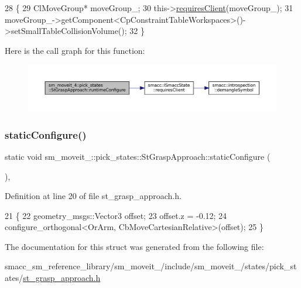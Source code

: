 \begin{DoxyCode}
28     \{
29         ClMoveGroup* moveGroup\_;
30         this->\hyperlink{classsmacc_1_1ISmaccState_a7f95c9f0a6ea2d6f18d1aec0519de4ac}{requiresClient}(moveGroup\_);
31         moveGroup\_->getComponent<CpConstraintTableWorkspaces>()->setSmallTableCollisionVolume();
32     \}
\end{DoxyCode}
Here is the call graph for this function\+:
\nopagebreak
\begin{figure}[H]
\begin{center}
\leavevmode
\includegraphics[width=350pt]{structsm__moveit__4_1_1pick__states_1_1StGraspApproach_a720bc0cdf90f16b038c22fdb717bb3a7_cgraph}
\end{center}
\end{figure}
\mbox{\label{structsm__moveit__4_1_1pick__states_1_1StGraspApproach_af561cae9fd41e10797391012ae7ad361}} 
\subsubsection{\texorpdfstring{static\+Configure()}{staticConfigure()}}
{\footnotesize\ttfamily static void sm\+\_\+moveit\+\_\+::pick\+\_\+states\+::\+St\+Grasp\+Approach\+::static\+Configure (\begin{DoxyParamCaption}{ }\end{DoxyParamCaption})\hspace{0.3cm}{\ttfamily [inline]}, {\ttfamily [static]}}



Definition at line 20 of file st\+\_\+grasp\+\_\+approach.\+h.


\begin{DoxyCode}
21     \{
22         geometry\_msgs::Vector3 offset;
23         offset.z = -0.12;
24         configure\_orthogonal<OrArm, CbMoveCartesianRelative>(offset);
25     \}
\end{DoxyCode}


The documentation for this struct was generated from the following file\+:\begin{DoxyCompactItemize}
\item 
smacc\+\_\+sm\+\_\+reference\+\_\+library/sm\+\_\+moveit\+\_/include/sm\+\_\+moveit\+\_/states/pick\+\_\+states/\hyperlink{4_2include_2sm__moveit__4_2states_2pick__states_2st__grasp__approach_8h}{st\+\_\+grasp\+\_\+approach.\+h}\end{DoxyCompactItemize}
